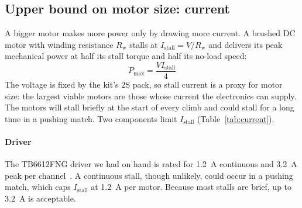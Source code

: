 \subsection{Upper bound on motor size: current}
\label{sec:current-bound}

A bigger motor makes more power only by drawing more current. A brushed DC motor with winding resistance $R_\mathrm{w}$ stalls at $I_\mathrm{stall} = V / R_\mathrm{w}$ and delivers its peak mechanical power at half its stall torque and half its no-load speed:
\begin{equation}
  P_\mathrm{max} = \frac{V I_\mathrm{stall}}{4}
  \label{eq:pmax}
\end{equation}
The voltage is fixed by the kit's 2S pack, so stall current is a proxy for motor size: the largest viable motors are those whose current the electronics can supply. The motors will stall briefly at the start of every climb and could stall for a long time in a pushing match. Two components limit $I_\mathrm{stall}$ (Table~\ref{tab:current}).

\paragraph{Driver}
The TB6612FNG driver we had on hand is rated for \qty{1.2}{A} continuous and \qty{3.2}{A} peak per channel~\cite{tb6612}. A continuous stall, though unlikely, could occur in a pushing match, which caps $I_\mathrm{stall}$ at \qty{1.2}{A} per motor. Because most stalls are brief, up to \qty{3.2}{A} is acceptable.

